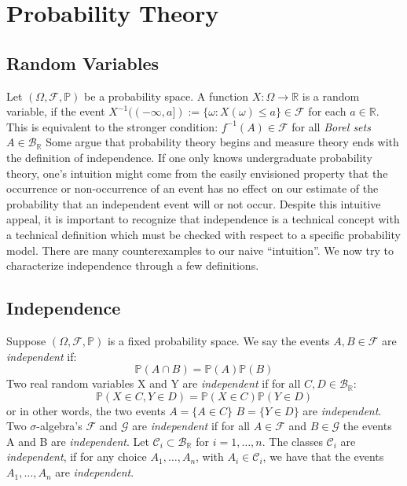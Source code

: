 \documentclass{article}
\begin{document}
\section{Probability Theory}
\subsection{Random Variables}
Let $(\Omega,\mathcal{F}, \mathbb{P})$ be a probability space. A function $X:\Omega\to\mathbb{R}$ is a random variable, if the event $X^{-1}((-\infty,a]):=\{\omega:X(\omega)\leq a\}\in\mathcal{F}$ for each $a \in \mathbb{R}$. This is equivalent to the stronger condition: $f^{-1}(A)\in\mathcal{F}$ for all \emph{Borel sets} $A\in\mathcal{B}_\mathbb{R}$  \newline \newline
Some argue that probability theory begins and measure theory ends with the definition of independence. If one only knows undergraduate probability theory, one's intuition might come from the easily envisioned property that the occurrence or non-occurrence of an event has no effect on our estimate of the probability that an independent event will or not occur.
Despite this intuitive appeal, it is important to recognize that independence is a technical concept with a technical definition which must be checked with respect to a specific probability model. There are many counterexamples to our naive ``intuition''. We now try to characterize independence through a few definitions.
\subsection{Independence}
Suppose $(\Omega, \mathcal{F},\mathbb{P})$ is a fixed probability space. We say the events $A, B \in \mathcal{F}$ are \emph{independent} if: \[
\mathbb{P}(A \cap B) = \mathbb{P}(A)\mathbb{P}(B)
\]
Two real random variables X and Y are \emph{independent} if for all $C,D\in\mathcal{B}_{\mathbb{R}}:$
\[
\mathbb{P}(X\in C,Y\in D)=\mathbb{P}(X\in C)\mathbb{P}(Y\in D)
\]
or in other words, the two events $A=\{A\in C\}$ $B=\{Y\in D\}$ are \emph{independent}.\newline \newline
Two $\sigma$-algebra's $\mathcal{F}$ and $\mathcal{G}$ are \emph{independent} if for all $A \in \mathcal{F}$ and $B \in \mathcal{G}$ the events A and B are \emph{independent}.\newline \newline
Let $\mathcal{C}_i\subset \mathcal{B}_{\mathbb{R}}$ for $i=1,\ldots,n$. The classes $\mathcal{C}_i$ are \emph{independent}, if for any choice $A_1,\ldots,A_n$, with $A_i\in\mathcal{C}_i$, we have that the events $A_1,\ldots,A_n$ are \emph{independent}.
\end{document}
